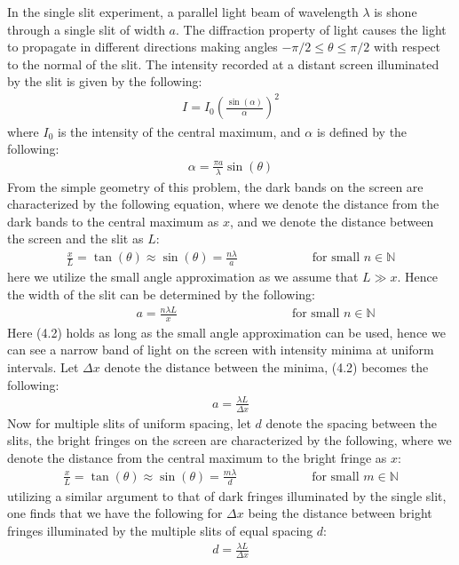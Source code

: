 \documentclass[11pt]{book}
\theoremstyle{break}
\theoremstyle{break}
\newcommand{\N}{\mathbb{N}}
\begin{document}
In the single slit experiment, a parallel light beam of wavelength $\lambda$ is shone through a single slit of width $a$. The diffraction property of light causes the light to propagate in different directions making angles $-\pi/2\leq \theta\leq \pi/2$ with respect to the normal of the slit. The intensity recorded at a distant screen illuminated by the slit is given by the following:
\begin{align*}
I = I_0 \left( \frac{\sin(\alpha)}{\alpha}\right)^2
\end{align*}
where $I_0$ is the intensity of the central maximum, and $\alpha$ is defined by the following:
\begin{align*}
\alpha = \frac{\pi a}{\lambda} \sin(\theta)
\end{align*}
From the simple geometry of this problem, the dark bands on the screen are characterized by the following equation, where we denote the distance from the dark bands to the central maximum as $x$, and we denote the distance between the screen and the slit as $L$:
\begin{align}
\frac{x}{L} = \tan(\theta) \approx \sin(\theta) =  \frac{n\lambda}{a} \qquad\qquad\qquad \text{for small } n \in \N
\end{align}
here we utilize the small angle approximation as we assume that $L \gg x$. Hence the width of the slit can be determined by the following:
\begin{align}
\qquad\qquad a = \frac{n \lambda L}{x} \ \quad\qquad\qquad\qquad\qquad \text{for small } n \in \N
\end{align}
Here (4.2) holds as long as the small angle approximation can be used, hence we can see a narrow band of light on the screen with intensity minima at uniform intervals. Let $\Delta x$ denote the distance between the minima, (4.2) becomes the following:
\begin{align}
a = \frac{\lambda L }{\Delta x}
\end{align}
Now for multiple slits of uniform spacing, let $d$ denote the spacing between the slits, the bright fringes on the screen are characterized by the following, where we denote the distance from the central maximum to the bright fringe as $x$:
\begin{align}
\frac{x}{L}=\tan(\theta) \approx \sin(\theta) =\frac{ m \lambda}{d}  \qquad\qquad\qquad \text{for small }m \in \N
\end{align}
utilizing a similar argument to that of dark fringes illuminated by the single slit, one finds that we have the following for $\Delta x$ being the distance between bright fringes illuminated by the multiple slits of equal spacing $d$:
\begin{align}
d = \frac{\lambda L}{\Delta x}
\end{align}
\end{document}
